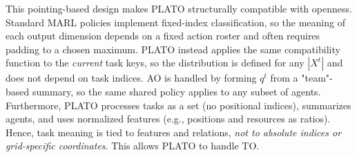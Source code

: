 This pointing-based design makes PLATO structurally compatible with openness. Standard MARL policies implement fixed-index classification, so the meaning of each output dimension depends on a fixed action roster and often requires padding to a chosen maximum.  PLATO instead applies the same compatibility function to the \emph{current} task keys, so the distribution is defined for any $|X^t|$ and does not depend on task indices. AO is handled by forming $q^t$ from a "team"-based summary, so the same shared policy applies to any subset of agents.  Furthermore,  PLATO processes tasks as a set (no positional indices), summarizes agents, and uses normalized features (e.g., positions and resources as ratios). Hence, task meaning is tied to features and relations, \emph{not to absolute indices or grid-specific coordinates}. This allows PLATO to handle TO.







